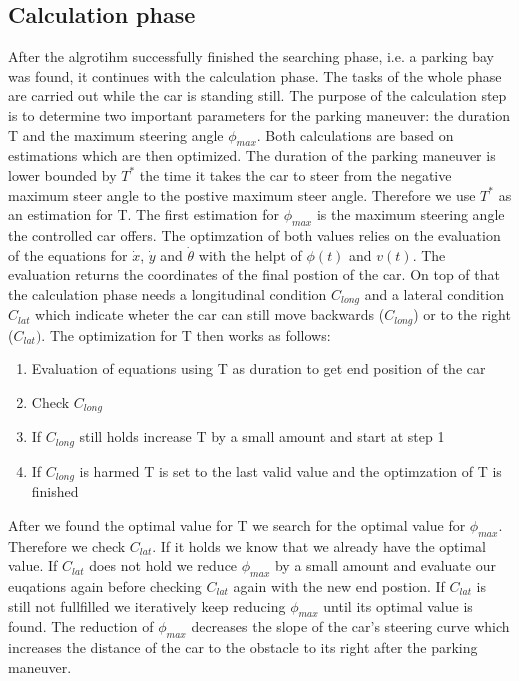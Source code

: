 \documentclass[paper=a4, fontsize=11pt]{scrreprt}
\begin{document}
\subsection{Calculation phase} \label{calculating}
After the algrotihm successfully finished the searching phase, i.e. a parking bay was found, it continues with the calculation phase. The tasks of the whole phase are carried out while the car is standing still. The purpose of the calculation step is to determine two important parameters for the parking maneuver: the duration T and the maximum steering angle $\phi_{max}$. Both calculations are based on estimations which are then optimized. The duration of the parking maneuver is lower bounded by $T^*$ the time it takes the car to steer from the negative maximum steer angle to the postive maximum steer angle. Therefore we use $T^*$ as an estimation for T. The first estimation for $\phi_{max}$ is the maximum steering angle the controlled car offers. The optimzation of both values relies on the evaluation of the equations for $\dot{x}$, $\dot{y}$ and $\dot{\theta}$ with the helpt of $\phi(t)$ and $v(t)$. The evaluation returns the coordinates of the final postion of the car. On top of that the calculation phase needs a longitudinal condition $C_{long}$ and a lateral condition $C_{lat}$ which indicate wheter the car can still move backwards ($C_{long}$) or to the right ($C_{lat})$. The optimization for T then works as follows:
\begin{enumerate}
	\item Evaluation of equations using T as duration to get end position of the car
	\item Check $C_{long}$
	\item If $C_{long}$ still holds increase T by a small amount and start at step 1
	\item If $C_{long}$ is harmed T is set to the last valid value and the optimzation of T is finished
\end{enumerate}
After we found the optimal value for T we search for the optimal value for $\phi_{max}$. Therefore we check $C_{lat}$. If it holds we know that we already have the optimal value. If $C_{lat}$ does not hold we reduce $\phi_{max}$ by a small amount and evaluate our euqations again before checking $C_{lat}$ again with the new end postion. If $C_{lat}$ is still not fullfilled we iteratively keep reducing $\phi_{max}$ until its optimal value is found. The reduction of $\phi_{max}$ decreases the slope of the car's steering curve which increases the distance of the car to the obstacle to its right after the parking maneuver.
\end{document}
